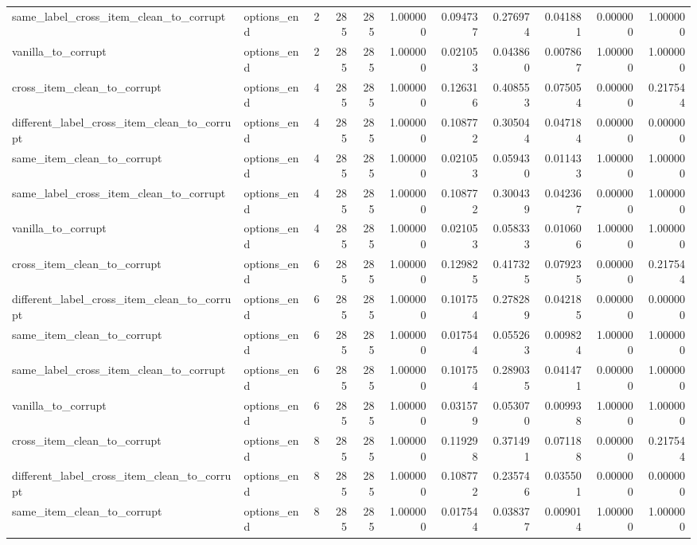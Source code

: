 \begin{tabular}{llrrrrrrrrr}
same\_label\_cross\_item\_clean\_to\_corrupt & options\_end & 2 & 285 & 285 & 1.000000 & 0.094737 & 0.276974 & 0.041881 & 0.000000 & 1.000000 \\
vanilla\_to\_corrupt & options\_end & 2 & 285 & 285 & 1.000000 & 0.021053 & 0.043860 & 0.007867 & 1.000000 & 1.000000 \\
cross\_item\_clean\_to\_corrupt & options\_end & 4 & 285 & 285 & 1.000000 & 0.126316 & 0.408553 & 0.075054 & 0.000000 & 0.217544 \\
different\_label\_cross\_item\_clean\_to\_corrupt & options\_end & 4 & 285 & 285 & 1.000000 & 0.108772 & 0.305044 & 0.047184 & 0.000000 & 0.000000 \\
same\_item\_clean\_to\_corrupt & options\_end & 4 & 285 & 285 & 1.000000 & 0.021053 & 0.059430 & 0.011433 & 1.000000 & 1.000000 \\
same\_label\_cross\_item\_clean\_to\_corrupt & options\_end & 4 & 285 & 285 & 1.000000 & 0.108772 & 0.300439 & 0.042367 & 0.000000 & 1.000000 \\
vanilla\_to\_corrupt & options\_end & 4 & 285 & 285 & 1.000000 & 0.021053 & 0.058333 & 0.010606 & 1.000000 & 1.000000 \\
cross\_item\_clean\_to\_corrupt & options\_end & 6 & 285 & 285 & 1.000000 & 0.129825 & 0.417325 & 0.079235 & 0.000000 & 0.217544 \\
different\_label\_cross\_item\_clean\_to\_corrupt & options\_end & 6 & 285 & 285 & 1.000000 & 0.101754 & 0.278289 & 0.042185 & 0.000000 & 0.000000 \\
same\_item\_clean\_to\_corrupt & options\_end & 6 & 285 & 285 & 1.000000 & 0.017544 & 0.055263 & 0.009824 & 1.000000 & 1.000000 \\
same\_label\_cross\_item\_clean\_to\_corrupt & options\_end & 6 & 285 & 285 & 1.000000 & 0.101754 & 0.289035 & 0.041471 & 0.000000 & 1.000000 \\
vanilla\_to\_corrupt & options\_end & 6 & 285 & 285 & 1.000000 & 0.031579 & 0.053070 & 0.009938 & 1.000000 & 1.000000 \\
cross\_item\_clean\_to\_corrupt & options\_end & 8 & 285 & 285 & 1.000000 & 0.119298 & 0.371491 & 0.071188 & 0.000000 & 0.217544 \\
different\_label\_cross\_item\_clean\_to\_corrupt & options\_end & 8 & 285 & 285 & 1.000000 & 0.108772 & 0.235746 & 0.035501 & 0.000000 & 0.000000 \\
same\_item\_clean\_to\_corrupt & options\_end & 8 & 285 & 285 & 1.000000 & 0.017544 & 0.038377 & 0.009014 & 1.000000 & 1.000000 \\

\end{tabular}
